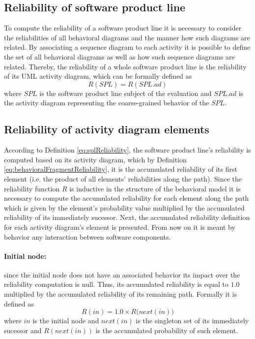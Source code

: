 \subsection{Reliability of software product line
	\label{sec:reliabilityOfSoftwareProductLinesAtUmlBehavioralModels}}


To compute the reliability of a software product line it is necessary to
consider the reliabilities of all behavioral diagrams and  the manner how such
diagrams are related. By associating a sequence diagram to each activity it is possible to define the set of all
behavioral diagrams as well as how such sequence diagrams are related.  Thereby,
the reliability of a whole software product line is the reliability of its UML
activity diagram, which can be formally defined as \begin{equation}
	\label{eq:splReliability} R(SPL) = R(SPL.ad) \end{equation} where $SPL$
is the software product line subject of the evaluation and $SPL.ad$ is the
activity diagram representing the  coarse-grained behavior of the $SPL$.

\subsection{Reliability of activity diagram elements
	\label{sec:reliabilityOfActivityDiagramModels}}

According to Definition \ref{eq:splReliability}, the software product line's
reliability is computed based on its activity diagram, which by Definition
\ref{eq:behavioralFragmentReliability}, it is the accumulated reliability of its
first element (i.e. the product of all elements' reliabilities along
the path). Since the reliability function $R$ is inductive in the structure of
the behavioral model it is necessary to compute the accumulated reliability for
each element along the path which is given by the element's probability value multiplied by the
accumulated reliability of its immediately sucessor. Next, the
accumulated reliability definition for each activity diagram's element is
presented. From now on it is meant by behavior any interaction between software components.

\paragraph{Initial node:}
since the initial node does not have an associated behavior its impact over the
reliability computation is null. Thus, its accumulated reliability is equal to
$1.0$ multiplied by the accumulated reliability of its remaining path. Formally
it is defined as \begin{equation} \label{eq:initialNodeReliability}R(in) = 1.0
	\times R\big(next(in)\big)\end{equation} where $in$ is the initial node and
$next(in)$ is the singleton set of its immediately sucessor and $R(next(in))$ is the accumulated probability of such element.

